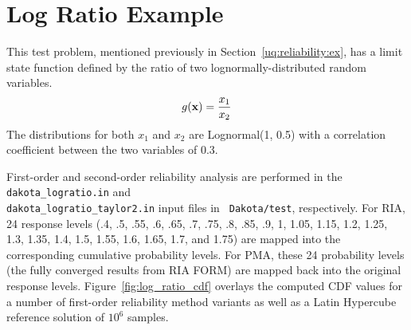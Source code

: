 
\section{Log Ratio Example}\label{additional:logratio}

This test problem, mentioned previously in
Section~\ref{uq:reliability:ex}, has a limit state function defined by
the ratio of two lognormally-distributed random variables.
\begin{equation}
g({\bf x}) = \frac{x_1}{x_2}
\end{equation}
The distributions for both $x_1$ and $x_2$ are Lognormal(1, 0.5) with
a correlation coefficient between the two variables of 0.3.

First-order and second-order reliability analysis are performed in the
\texttt{dakota\_logratio.in} and \\
\texttt{dakota\_logratio\_taylor2.in} input files in {\tt
Dakota/test}, respectively.  For RIA, 24 response levels (.4, .5, .55,
.6, .65, .7, .75, .8, .85, .9, 1, 1.05, 1.15, 1.2, 1.25, 1.3, 1.35,
1.4, 1.5, 1.55, 1.6, 1.65, 1.7, and 1.75) are mapped into the
corresponding cumulative probability levels.  For PMA, these 24
probability levels (the fully converged results from RIA FORM) are
mapped back into the original response levels.
Figure~\ref{fig:log_ratio_cdf} overlays the computed CDF values for a
number of first-order reliability method variants as well as a Latin
Hypercube reference solution of $10^6$ samples.
